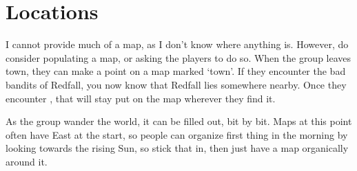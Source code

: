 \chapter{Locations}

I cannot provide much of a map, as I don't know where anything is.
However, do consider populating a map, or asking the players to do so.
When the group leaves \gls{town}, they can make a point on a map marked `town'.
If they encounter the bad bandits of Redfall, you now know that Redfall lies somewhere nearby.
Once they encounter , that will stay put on the map wherever they find it.

As the group wander the world, it can be filled out, bit by bit.
Maps at this point often have East at the start, so people can organize first thing in the morning by looking towards the rising Sun, so stick that in, then just have a map organically around it.




